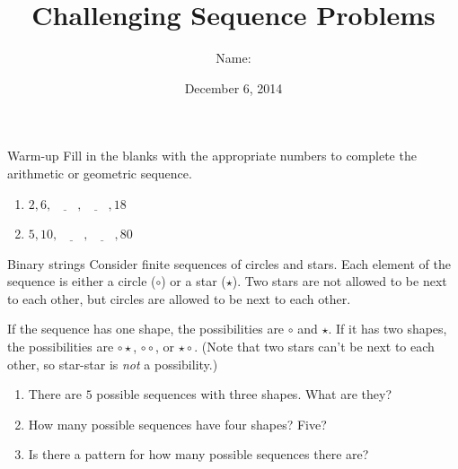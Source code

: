 \documentclass[12pt,letterpaper]{article}
\title{Challenging Sequence Problems}
\author{Name: \underline{\hspace{5cm}}}
\date{December 6, 2014}
\begin{document}
\maketitle

\thispagestyle{empty}

\begin{problem}{Warm-up}
Fill in the blanks with the appropriate numbers to complete the arithmetic or
geometric sequence.

\begin{enumerate}
 \item $2, 6, \underline{\hspace{2em}}, \underline{\hspace{2em}}, 18$
 \item $5, 10, \underline{\hspace{2em}}, \underline{\hspace{2em}}, 80$
\end{enumerate}
\end{problem}

\begin{problem}{Binary strings}
 Consider finite sequences of circles and stars. Each element of the sequence is
 either a circle ($\circ$) or a star ($\star$). Two stars are not allowed to be
 next to each other, but circles are allowed to be next to each other.

 If the sequence has one shape, the possibilities are $\circ$ and $\star$. If it
 has two shapes, the possibilities are $\circ \star$, $\circ \circ$, or $\star
 \circ$. (Note that two stars can't be next to each other, so star-star is
 \emph{not} a possibility.)

 \begin{enumerate}
  \item There are $5$ possible sequences with three shapes. What are they?
  \item How many possible sequences have four shapes? Five?
  \item Is there a pattern for how many possible sequences there are?
 \end{enumerate}
\end{problem}
\end{document}

